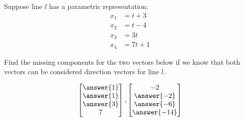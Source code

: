 \documentclass{ximera}
\begin{document}

\begin{problem}\label{prob:directionvect2}
Suppose line $l$ has a parametric representation:
\begin{align*}
x_1&=t+3\\
x_2&=t-4\\
x_3&=3t\\
x_4&=7t+1
\end{align*}

Find the missing components for the two vectors below if we know that both vectors can be considered  direction vectors for line $l$.

$$\begin{bmatrix}\answer{1}\\\answer{1}\\\answer{3}\\7\end{bmatrix},\begin{bmatrix}-2\\\answer{-2}\\\answer{-6}\\\answer{-14}\end{bmatrix}$$
\end{problem}

\end{document}
